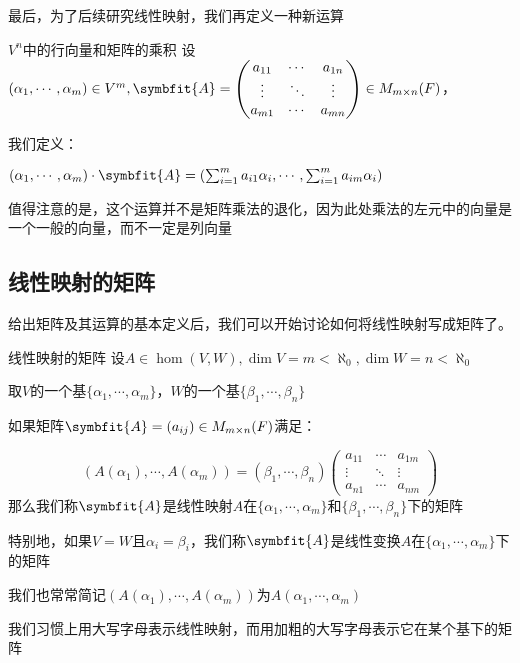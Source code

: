 \documentclass[12pt, a4paper, oneside, UTF8]{ctexbook}
\begin{document}
\begin{para}{0}
			最后，为了后续研究线性映射，我们再定义一种新运算
				\begin{defn}{$V^n$中的行向量和矩阵的乘积}{}
					设$(\alpha_1,\cdots,\alpha_m)\in V^m,\symbfit{A}=\begin{pmatrix}
					a_{11} & \cdots & a_{1n} \\
					\vdots & \ddots & \vdots \\
					a_{m1} & \cdots & a_{mn}
					\end{pmatrix}\in M_{m \times n}(F)$，
					
					我们定义：

					$(\alpha_1,\cdots,\alpha_m) \cdot \symbfit{A} = (\sum_{i=1}^m a_{i1}\alpha_i  , \cdots , \sum_{i=1}^m a_{im}\alpha_i)$
				\end{defn}
				值得注意的是，这个运算并不是矩阵乘法的退化，因为此处乘法的左元中的向量是一个一般的向量，而不一定是列向量
		\end{para}
		\subsection{线性映射的矩阵}
			给出矩阵及其运算的基本定义后，我们可以开始讨论如何将线性映射写成矩阵了。
			\begin{defn}{线性映射的矩阵}{}
				设$A \in \hom(V,W),\dim V = m < \aleph_0,\dim W = n < \aleph_0$

				取$V$的一个基$\{\alpha_1,\cdots,\alpha_m\}$，$W$的一个基$\{\beta_1,\cdots,\beta_n\}$

				如果矩阵$\symbfit{A}=(a_{ij}) \in M_{m \times n}(F)$满足：

				\begin{equation}
					\left(A(\alpha_1),\cdots,A(\alpha_m)\right) = (\beta_1,\cdots,\beta_n)\begin{pmatrix}
						a_{11} & \cdots & a_{1m} \\
						\vdots & \ddots & \vdots \\
						a_{n1} & \cdots & a_{nm}
					\end{pmatrix}
				\end{equation}
				那么我们称$\symbfit{A}$是线性映射$A$在$\{\alpha_1,\cdots,\alpha_m\}$和$\{\beta_1,\cdots,\beta_n\}$下的矩阵

				特别地，如果$V=W$且$\alpha_i = \beta_i$，我们称$\symbfit{A}$是线性变换$A$在$\{\alpha_1,\cdots,\alpha_m\}$下的矩阵
			\end{defn}
			我们也常常简记$\left(A(\alpha_1),\cdots,A(\alpha_m)\right)$为$A(\alpha_1,\cdots,\alpha_m)$

			我们习惯上用大写字母表示线性映射，而用加粗的大写字母表示它在某个基下的矩阵
			
\end{document}
